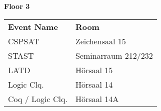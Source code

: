 \documentclass{article}
\begin{document}

\begin{vsltext}{3.0cm}{3.2cm}
    \begin{center}
        {\color{areagreen}\textbf{Floor 3}}
    \end{center}
\end{vsltext}

\vspace{1.2cm}

\begin{vsltext}{1.5cm}{2.5cm}
\begin{center}
    \begin{tabular}{ L{10.5cm} l}
        \textbf{Event Name} & \textbf{Room} \\
        CSPSAT & Zeichensaal 15 \\
        STAST & Seminarraum 212/232 \\
        LATD & Hörsaal 15 \\
        Logic Clq. & Hörsaal 14 \\
        Coq / Logic Clq. & Hörsaal 14A \\
\end{tabular}
\end{center}
\end{vsltext}
\end{document}
